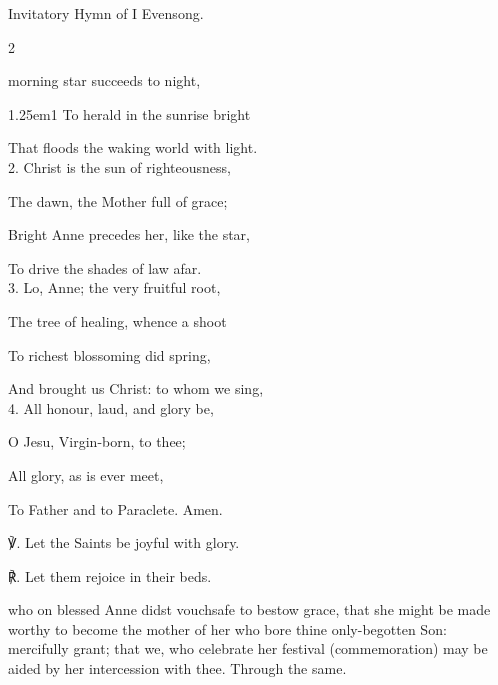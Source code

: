 \mattins
{}

\begin{rubric}
	Invitatory Hymn of I Evensong.
\end{rubric}

\mattinsOfficeHymn

\begin{multicols}{2}
\sloppy

 morning star succeeds to night,


\begin{hangparas}{1.25em}{1}
To herald in the sunrise bright

That floods the waking world with light.\\

2. Christ is the sun of righteousness,

The dawn, the Mother full of grace;

Bright Anne precedes her, like the star,

To drive the shades of law afar.\\

3. Lo, Anne; the very fruitful root,

The tree of healing, whence a shoot

To richest blossoming did spring,

And brought us Christ: to whom we sing,\\

4. All honour, laud, and glory be,

O Jesu, Virgin-born, to thee;

All glory, as is ever meet,

To Father and to Paraclete. Amen.\\
\end{hangparas}

℣. Let the Saints be joyful with glory.

℟. Let them rejoice in their beds.


\fussy	
\end{multicols}

\collect
{} who on blessed Anne didst vouchsafe to bestow grace, that she might be made worthy to become the mother of her who bore thine only-begotten Son: mercifully grant; that we, who celebrate her festival (commemoration) may be aided by her intercession with thee. Through the same.


